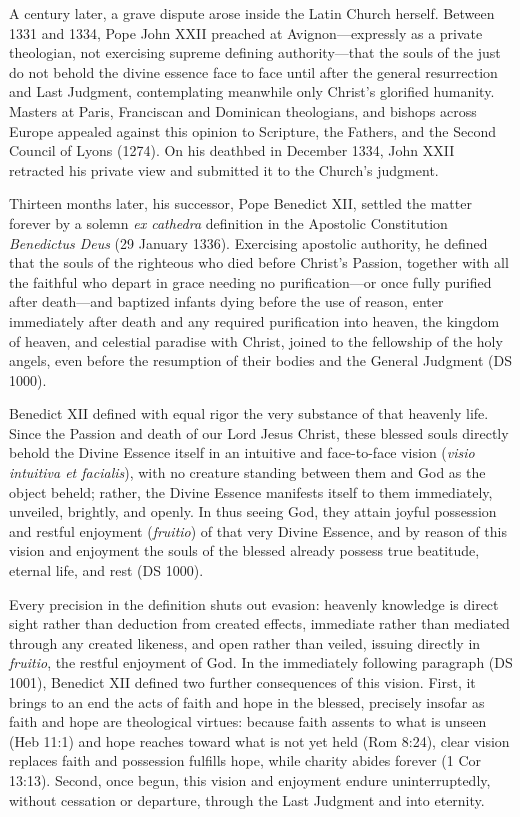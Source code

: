 A century later, a grave dispute arose inside the Latin Church herself. Between 1331 and 1334, Pope John XXII preached at Avignon---expressly as a private theologian, not exercising supreme defining authority---that the souls of the just do not behold the divine essence face to face until after the general resurrection and Last Judgment, contemplating meanwhile only Christ's glorified humanity. Masters at Paris, Franciscan and Dominican theologians, and bishops across Europe appealed against this opinion to Scripture, the Fathers, and the Second Council of Lyons (1274). On his deathbed in December 1334, John XXII retracted his private view and submitted it to the Church's judgment.

Thirteen months later, his successor, Pope Benedict XII, settled the matter forever by a solemn \textit{ex cathedra} definition in the Apostolic Constitution \textit{Benedictus Deus} (29 January 1336). Exercising apostolic authority, he defined that the souls of the righteous who died before Christ's Passion, together with all the faithful who depart in grace needing no purification---or once fully purified after death---and baptized infants dying before the use of reason, enter immediately after death and any required purification into heaven, the kingdom of heaven, and celestial paradise with Christ, joined to the fellowship of the holy angels, even before the resumption of their bodies and the General Judgment (DS 1000).

Benedict XII defined with equal rigor the very substance of that heavenly life. Since the Passion and death of our Lord Jesus Christ, these blessed souls directly behold the Divine Essence itself in an intuitive and face-to-face vision (\textit{visio intuitiva et facialis}), with no creature standing between them and God as the object beheld; rather, the Divine Essence manifests itself to them immediately, unveiled, brightly, and openly. In thus seeing God, they attain joyful possession and restful enjoyment (\textit{fruitio}) of that very Divine Essence, and by reason of this vision and enjoyment the souls of the blessed already possess true beatitude, eternal life, and rest (DS 1000).

Every precision in the definition shuts out evasion: heavenly knowledge is direct sight rather than deduction from created effects, immediate rather than mediated through any created likeness, and open rather than veiled, issuing directly in \textit{fruitio}, the restful enjoyment of God. In the immediately following paragraph (DS 1001), Benedict XII defined two further consequences of this vision. First, it brings to an end the acts of faith and hope in the blessed, precisely insofar as faith and hope are theological virtues: because faith assents to what is unseen (Heb 11:1) and hope reaches toward what is not yet held (Rom 8:24), clear vision replaces faith and possession fulfills hope, while charity abides forever (1 Cor 13:13). Second, once begun, this vision and enjoyment endure uninterruptedly, without cessation or departure, through the Last Judgment and into eternity.

